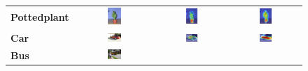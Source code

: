 \begin{figure}[H]
\begin{tcolorbox}[colframe=black!60, colback=white, boxrule=0.8pt, arc=2pt, left=2pt, right=2pt, top=2pt, bottom=2pt]
\begin{tabular}{m{2.5cm} c c c}
    \\
    \textbf{Pottedplant}
    & \includegraphics[width=0.18\textwidth,height=0.18\textwidth]{figures/originals/2011_000145}
    & \includegraphics[width=0.18\textwidth,height=0.18\textwidth]{figures/val_cams/weclip/2011_000145_15}
    & \includegraphics[width=0.18\textwidth,height=0.18\textwidth]{figures/val_cams/ours/2011_000145_15}
    \\
    \textbf{Car}
    & \includegraphics[width=0.18\textwidth,height=0.18\textwidth]{figures/originals/2010_005119}
    & \includegraphics[width=0.18\textwidth,height=0.18\textwidth]{figures/val_cams/weclip/2010_005119_6}
    & \includegraphics[width=0.18\textwidth,height=0.18\textwidth]{figures/val_cams/ours/2010_005119_6}
    \\
    \textbf{Bus}
    & \includegraphics[width=0.18\textwidth,height=0.18\textwidth]{figures/originals/2010_000148}

\end{tabular}
\end{tcolorbox}
\end{figure}
